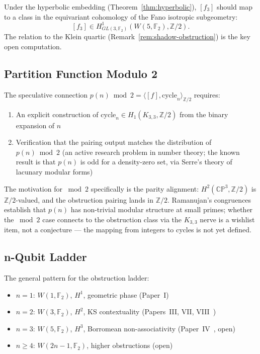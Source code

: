 \documentclass[11pt,a4paper]{article}
\theoremstyle{remark}
\newcommand{\CP}{\mathbb{CP}}
\newcommand{\Z}{\mathbb{Z}}
\newcommand{\F}{\mathbb{F}}
\begin{document}
Under the hyperbolic embedding (Theorem~\ref{thm:hyperbolic}), $[f_3]$
should map to a class in the equivariant cohomology of the Fano isotropic
subgeometry:
\[
[f_3] \in H^1_{GL(3, \F_2)}(W(5, \F_2), \Z/2).
\]
The relation to the Klein quartic
(Remark~\ref{rem:shadow-obstruction}) is the key
open computation.

\subsection{Partition Function Modulo 2}

The speculative connection
$p(n) \bmod 2 = \langle [f], \text{cycle}_n \rangle_{\Z/2}$ requires:
\begin{enumerate}
  \item An explicit construction of $\text{cycle}_n \in H_1(K_{3,3}, \Z/2)$
    from the binary expansion of $n$
  \item Verification that the pairing output matches the distribution of
    $p(n) \bmod 2$ (an active research problem in number theory; the
    known result is that $p(n)$ is odd for a density-zero set, via
    Serre's theory of lacunary modular forms)
\end{enumerate}

The motivation for $\bmod 2$ specifically is the parity alignment:
$H^2(\CP^3, \Z/2)$ is $\Z/2$-valued, and the obstruction pairing
lands in $\Z/2$. Ramanujan's congruences establish that $p(n)$ has
non-trivial modular structure at small primes; whether the $\bmod 2$
case connects to the obstruction class via the $K_{3,3}$ nerve is a
wishlist item, not a conjecture --- the mapping from integers to
cycles is not yet defined.

\subsection{n-Qubit Ladder}

The general pattern for the obstruction ladder:
\begin{itemize}
  \item $n=1$: $W(1, \F_2)$, $H^1$, geometric phase (Paper~I)
  \item $n=2$: $W(3, \F_2)$, $H^2$, KS contextuality
    (Papers~III, VII, VIII~\cite{PaperIII, PaperVII, PaperVIII})
  \item $n=3$: $W(5, \F_2)$, $H^3$, Borromean non-associativity
    (Paper~IV~\cite{PaperIV}, open)
  \item $n \geq 4$: $W(2n-1, \F_2)$, higher obstructions (open)
\end{itemize}
\end{document}
